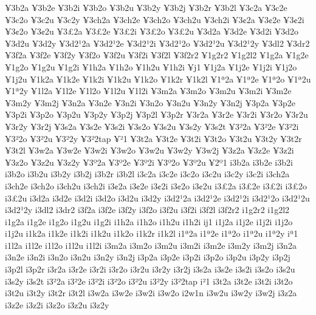 {%
^^a53b2a 
^^a53b2e 
^^a53b2i 
^^a53b2o
^^a53b2u
^^a53b2y
^^a53b2j
^^a53b2r
^^a53b2l
^^a53c2a
^^a53c2e
^^a53c2o
^^a53c2u
^^a53c2y
^^a53ch2a
^^a53ch2e
^^a53ch2o
^^a53ch2u
^^a53ch2i
^^a53^^a22a
^^a53^^a22e
^^a53^^a22i
^^a53^^a22o
^^a53^^a22u
^^a53^^a32a
^^a53^^a32e
^^a53^^a32i
^^a53^^a32o
^^a53^^a32u
^^a53d2a
^^a53d2e
^^a53d2i
^^a53d2o
^^a53d2u
^^a53d2y
^^a53d2^^b92a
^^a53d2^^b92e
^^a53d2^^b92i
^^a53d2^^b92o
^^a53d2^^b92u
^^a53d2^^b92y
^^a53dl2
^^a53dr2
^^a53f2a
^^a53f2e
^^a53f2y
^^a53f2o
^^a53f2u
^^a53f2i
^^a53f2l
^^a53f2r2
^^a51g2r2
^^a51g2l2
^^a51g2a
^^a51g2e
^^a51g2o
^^a51g2u
^^a51g2i
^^a51h2a
^^a51h2o
^^a51h2u
^^a51h2i
^^a5j1
^^a51j2a
^^a51j2e
^^a51j2i
^^a51j2o
^^a51j2u
^^a51k2a
^^a51k2e
^^a51k2i
^^a51k2u
^^a51k2o
^^a51k2r
^^a51k2l
^^a51^^aa2a
^^a51^^aa2e
^^a51^^aa2o
^^a51^^aa2u
^^a51^^aa2y
^^a51l2a
^^a51l2e
^^a51l2o
^^a51l2u
^^a51l2i
^^a53m2a
^^a53m2o
^^a53m2u
^^a53m2i
^^a53m2e
^^a53m2y
^^a53m2j
^^a53n2a
^^a53n2e
^^a53n2i
^^a53n2o
^^a53n2u
^^a53n2y
^^a53n2j
^^a53p2a
^^a53p2e
^^a53p2i
^^a53p2o
^^a53p2u
^^a53p2y
^^a53p2j
^^a53p2l
^^a53p2r
^^a53r2a
^^a53r2e
^^a53r2i
^^a53r2o
^^a53r2u
^^a53r2y
^^a53r2j
^^a53s2a
^^a53s2e
^^a53s2i
^^a53s2o
^^a53s2u
^^a53s2y
^^a53s2t
^^a53^^b22a
^^a53^^b22e
^^a53^^b22i
^^a53^^b22o
^^a53^^b22u
^^a53^^b22y
^^a53^^b22tap
^^a5^^b21
^^a53t2a
^^a53t2e
^^a53t2i
^^a53t2o
^^a53t2u
^^a53t2y
^^a53t2r
^^a53t2l
^^a53w2a
^^a53w2e
^^a53w2i
^^a53w2o
^^a53w2u
^^a53w2y
^^a53w2j
^^a53z2a
^^a53z2e
^^a53z2i
^^a53z2o
^^a53z2u
^^a53z2y
^^a53^^ba2a
^^a53^^ba2e
^^a53^^ba2i
^^a53^^ba2o
^^a53^^ba2u
^^a52^^ba1                       
i3b2a 
i3b2e 
i3b2i 
i3b2o
i3b2u
i3b2y
i3b2j
i3b2r
i3b2l
i3c2a
i3c2e
i3c2o
i3c2u
i3c2y
i3c2i
i3ch2a
i3ch2e
i3ch2o
i3ch2u
i3ch2i
i3^^a22a
i3^^a22e
i3^^a22i
i3^^a22o
i3^^a22u
i3^^a32a
i3^^a32e
i3^^a32i
i3^^a32o
i3^^a32u
i3d2a
i3d2e
i3d2i
i3d2o
i3d2u
i3d2y
i3d2^^b92a
i3d2^^b92e
i3d2^^b92i
i3d2^^b92o
i3d2^^b92u
i3d2^^b92y
i3dl2
i3dr2
i3f2a
i3f2e
i3f2y
i3f2o
i3f2u
i3f2i
i3f2l
i3f2r2
i1g2r2
i1g2l2
i1g2a
i1g2e
i1g2o
i1g2u
i1g2i
i1h2a
i1h2o
i1h2u
i1h2i
ij1
i1j2a
i1j2e
i1j2i
i1j2o
i1j2u
i1k2a
i1k2e
i1k2i
i1k2u
i1k2o
i1k2r
i1k2l
i1^^aa2a
i1^^aa2e
i1^^aa2o
i1^^aa2u
i1^^aa2y
i^^aa1
i1l2a
i1l2e
i1l2o
i1l2u
i1l2i
i3m2a
i3m2o
i3m2u
i3m2i
i3m2e
i3m2y
i3m2j
i3n2a
i3n2e
i3n2i
i3n2o
i3n2u
i3n2y
i3n2j
i3p2a
i3p2e
i3p2i
i3p2o
i3p2u
i3p2y
i3p2j
i3p2l
i3p2r
i3r2a
i3r2e
i3r2i
i3r2o
i3r2u
i3r2y
i3r2j
i3s2a
i3s2e
i3s2i
i3s2o
i3s2u
i3s2y
i3s2t
i3^^b22a
i3^^b22e
i3^^b22i
i3^^b22o
i3^^b22u
i3^^b22y
i3^^b22tap
i^^b21
i3t2a
i3t2e
i3t2i
i3t2o
i3t2u
i3t2y
i3t2r
i3t2l
i3w2a
i3w2e
i3w2i
i3w2o
i2w1n
i3w2u
i3w2y
i3w2j
i3z2a
i3z2e
i3z2i
i3z2o
i3z2u
i3z2y
}
